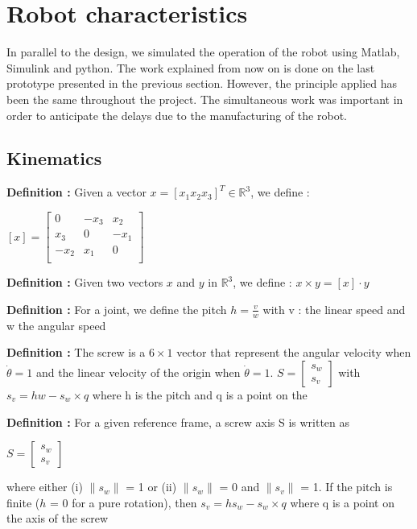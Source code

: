 \section{Robot characteristics}\insertloftspace
\setcounter{figure}{0}\setcounter{table}{0}

In parallel to the design, we simulated the operation of the robot using Matlab, Simulink and python. The work explained from now on is done on the last prototype presented in the previous section. However, the principle applied has been the same throughout the project. The simultaneous work was important in order to anticipate the delays due to the manufacturing of the robot. 

\subsection{Kinematics}

\textbf{Definition :} Given a vector $x=[x_1 x_2 x_3]^T \in \mathbb{R}^3$, we define : 
\begin{center}
    $[x] = \begin{bmatrix}
        0 & -x_3 & x_2 \\
        x_3 & 0 & -x_1 \\
        -x_2 & x_1 & 0 \\
    \end{bmatrix}$
\end{center}

\noindent\textbf{Definition :} Given two vectors $x$ and $y$ in $\mathbb{R}^3$, we define : $x\times y = [x]\cdot y$

\bigbreak
\noindent\textbf{Definition :} For a joint, we define the pitch $h = \frac{v}{w}$ with v : the linear speed and w the angular speed

\bigbreak
\noindent\textbf{Definition :} The screw is a $6\times1$ vector that represent the angular velocity when $\dot{\theta}=1$ and the linear velocity of the origin when $\dot{\theta}=1$. $S = \begin{bmatrix} s_w\\s_v\end{bmatrix}$ with $s_v = hw-s_w\times q$ where h is the pitch and q is a point on the 

\noindent\textbf{Definition :} For a given reference frame, a screw axis S is written as 
\begin{center}
    $S=\begin{bmatrix}
        s_w\\s_v
    \end{bmatrix}$
\end{center}
where either (i) $\|s_w\|$ = 1 or (ii) $\|s_w\|$ = 0 and $\|s_v\|$ = 1. If the pitch is finite ($h$ = 0 for a pure rotation), then $s_v = hs_w-s_w\times q$ where q is a point on the axis of the screw

